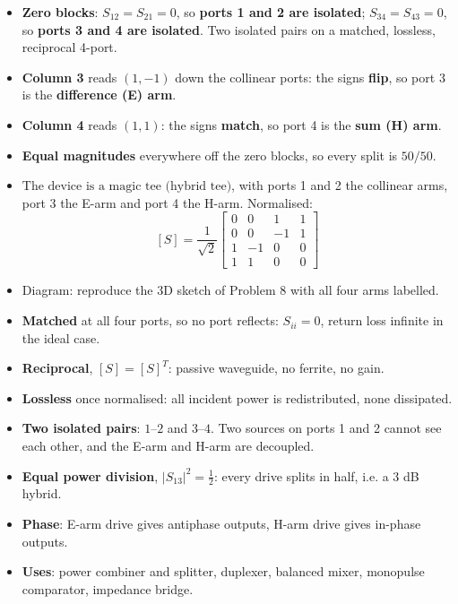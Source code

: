 \begin{itemize}
  \item \textbf{Zero blocks}: $S_{12} = S_{21} = 0$, so \textbf{ports 1 and 2 are
    isolated}; $S_{34} = S_{43} = 0$, so \textbf{ports 3 and 4 are isolated}. Two
    isolated pairs on a matched, lossless, reciprocal 4-port.
  \item \textbf{Column 3} reads $(1, -1)$ down the collinear ports: the signs
    \textbf{flip}, so port 3 is the \textbf{difference (E) arm}.
  \item \textbf{Column 4} reads $(1, 1)$: the signs \textbf{match}, so port 4 is the
    \textbf{sum (H) arm}.
  \item \textbf{Equal magnitudes} everywhere off the zero blocks, so every split is
    $50/50$.
\end{itemize}
\begin{itemize}
  \item $\boxed{\text{The device is a magic tee (hybrid tee)}}$, with ports 1 and 2 the
    collinear arms, port 3 the E-arm and port 4 the H-arm. Normalised:
    \[ [S] = \frac{1}{\sqrt{2}}\begin{bmatrix}
       0&0&1&1 \\ 0&0&-1&1 \\ 1&-1&0&0 \\ 1&1&0&0 \end{bmatrix} \]
  \item Diagram: reproduce the 3D sketch of Problem 8 with all four arms labelled.
\end{itemize}
\begin{itemize}
  \item \textbf{Matched} at all four ports, so no port reflects: $S_{ii}=0$, return loss
    infinite in the ideal case.
  \item \textbf{Reciprocal}, $[S]=[S]^{T}$: passive waveguide, no ferrite, no gain.
  \item \textbf{Lossless} once normalised: all incident power is redistributed, none
    dissipated.
  \item \textbf{Two isolated pairs}: $1$--$2$ and $3$--$4$. Two sources on ports 1 and 2
    cannot see each other, and the E-arm and H-arm are decoupled.
  \item \textbf{Equal power division}, $|S_{13}|^2 = \tfrac{1}{2}$: every drive splits in
    half, i.e. a $3$ dB hybrid.
  \item \textbf{Phase}: E-arm drive gives antiphase outputs, H-arm drive gives in-phase
    outputs.
  \item \textbf{Uses}: power combiner and splitter, duplexer, balanced mixer, monopulse
    comparator, impedance bridge.
\end{itemize}

